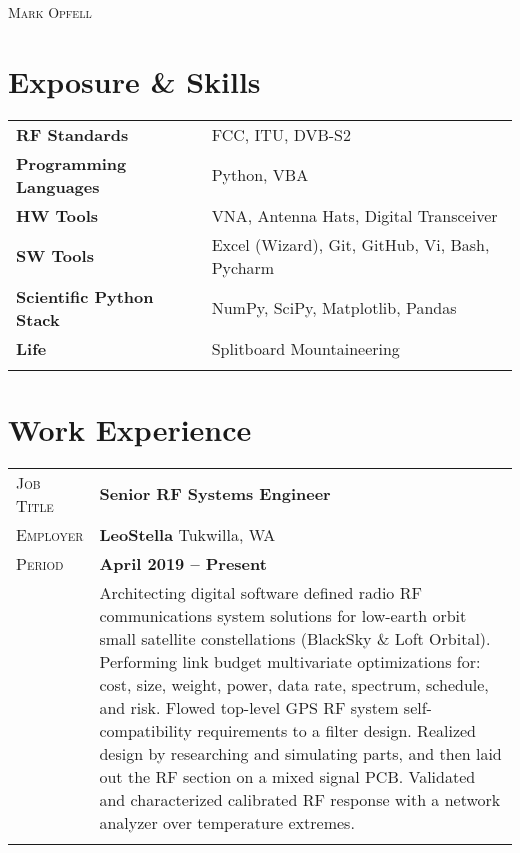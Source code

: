 \documentclass[a4paper, oneside, final]{scrartcl}
\newcommand{\gray}{\rowcolor[gray]{.90}} %
\begin{document}
\begin{center} %

\pdfpageheight 11in 
\pdfpagewidth 8.5in


{\fontsize{36}{36}\selectfont\scshape Mark Opfell} 
\vspace{1.16 cm} %


\section{Exposure \& Skills}
\begin{tabular}{ @{} >{\bfseries}l @{\hspace{6ex}} l }
RF Standards & FCC, ITU, DVB-S2 \\
Programming Languages & Python, VBA\\
HW Tools & VNA, Antenna Hats, Digital Transceiver\\
SW Tools & Excel (Wizard), Git, GitHub, Vi, Bash, Pycharm\\
Scientific Python Stack & NumPy, SciPy, Matplotlib, Pandas \\
Life & Splitboard Mountaineering \\
\\
\end{tabular}

\section{Work Experience}

\begin{tabularx}{0.97\linewidth}{>{\raggedleft\scshape}p{2cm}X}
\gray Job Title & \textbf{Senior RF Systems Engineer}\\
\gray Employer & \textbf{LeoStella} \hfill Tukwilla, WA\\
\gray Period & \textbf{April 2019 -- Present}\\
&
\vspace{-0.15 cm}
Architecting digital software defined radio RF communications system solutions for low-earth orbit small satellite constellations (BlackSky \& Loft Orbital).  Performing link budget multivariate optimizations for: cost, size, weight, power, data rate, spectrum, schedule, and risk.
\newline
\newline
Flowed top-level GPS RF system self-compatibility requirements to a filter design. Realized design by researching and simulating parts, and then laid out the RF section on a mixed signal PCB.  Validated and characterized calibrated RF response with a network analyzer over temperature extremes. 
\newline
\newline
\\
\\
\end{tabularx}


\end{center}
\end{document}
